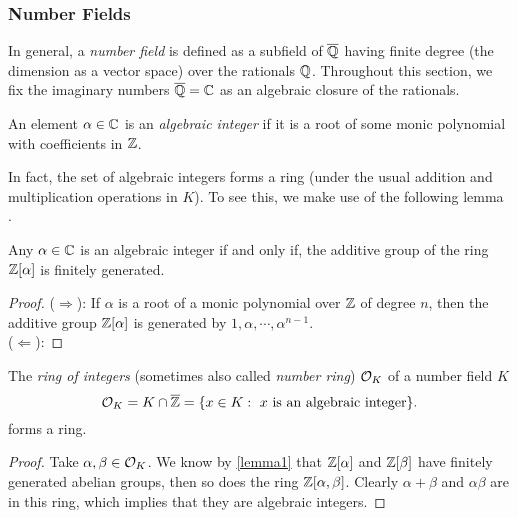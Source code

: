 \subsubsection*{Number Fields}
In general, a \textit{number field} is defined as a subfield of $\overline{\mathbb{Q}}$ having finite degree (the dimension as a vector space) over the rationals $\mathbb{Q}$. Throughout this section, we fix the imaginary numbers $\overline{\mathbb{Q}} = \mathbb{C}$ as an algebraic closure of the rationals.

\begin{definition}
    An element $\alpha \in \mathbb{C}$ is an \textit{algebraic integer} if it is a root of some monic polynomial with coefficients in $\mathbb{Z}$.
\end{definition}

In fact, the set of algebraic integers forms a ring (under the usual addition and multiplication operations in $K$). To see this, we make use of the following lemma .

\begin{lemma} \label{lemma1}
    Any $\alpha \in \mathbb{C}$ is an algebraic integer if and only if, the additive group of the ring $\mathbb{Z}[\alpha]$ is finitely generated.
\end{lemma}

\begin{proof}
    ($\Rightarrow$): If $\alpha$ is a root of a monic polynomial over $\mathbb{Z}$ of degree $n$, then the additive group $\mathbb{Z}[\alpha]$ is generated by $1, \alpha, \cdots, \alpha^{n-1}$. \\
    ($\Leftarrow$): 
\end{proof}

\begin{theorem}
The \textit{ring of integers} (sometimes also called \textit{number ring}) $\mathcal{O}_K$ of a number field $K$
$$
  \mathcal{O}_K = K \cap \overline{\mathbb{Z}} = \{x \in K : \text{ $x$ is an algebraic integer}\}.
$$
forms a ring.
\end{theorem}

\begin{proof}
    Take $\alpha, \beta \in \mathcal{O}_K$. We know by \ref{lemma1} that $\mathbb{Z}[\alpha]$ and $\mathbb{Z}[\beta]$ have finitely generated abelian groups, then so does the ring $\mathbb{Z}[\alpha, \beta]$. Clearly $\alpha + \beta$ and $\alpha\beta$ are in this ring, which implies that they are algebraic integers.
\end{proof}

